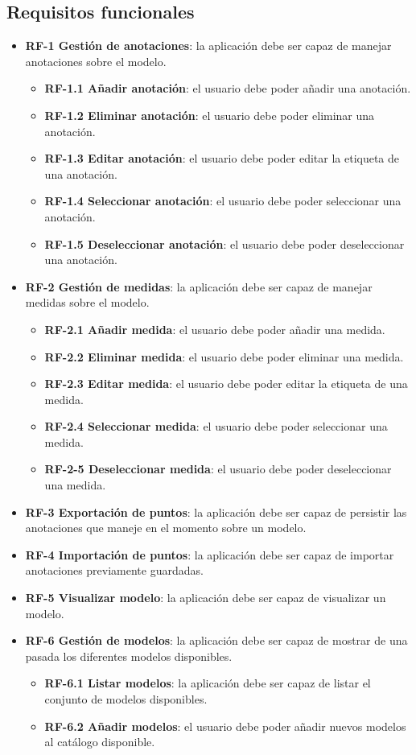 \subsection{Requisitos funcionales}
\begin{itemize}
	\item \textbf{RF-1 Gestión de anotaciones}: la aplicación debe ser capaz de manejar anotaciones sobre el modelo.
	\begin{itemize}
		\item \textbf{RF-1.1 Añadir anotación}: el usuario debe poder añadir una anotación.
		\item \textbf{RF-1.2 Eliminar anotación}: el usuario debe poder eliminar una anotación.
		\item \textbf{RF-1.3 Editar anotación}: el usuario debe poder editar la etiqueta de una anotación.
		\item \textbf{RF-1.4 Seleccionar anotación}: el usuario debe poder seleccionar una anotación.
		\item \textbf{RF-1.5 Deseleccionar anotación}: el usuario debe poder deseleccionar una anotación.
	\end{itemize}
	\item \textbf{RF-2 Gestión de medidas}: la aplicación debe ser capaz de manejar medidas sobre el modelo.
	\begin{itemize}
		\item \textbf{RF-2.1 Añadir medida}: el usuario debe poder añadir una medida.
		\item \textbf{RF-2.2 Eliminar medida}: el usuario debe poder eliminar una medida.
		\item \textbf{RF-2.3 Editar medida}: el usuario debe poder editar la etiqueta de una medida.
		\item \textbf{RF-2.4 Seleccionar medida}: el usuario debe poder seleccionar una medida.
		\item \textbf{RF-2-5 Deseleccionar medida}: el usuario debe poder deseleccionar una medida.
	\end{itemize}
	\item \textbf{RF-3 Exportación de puntos}: la aplicación debe ser capaz de persistir las anotaciones que maneje en el momento sobre un modelo.
	\item \textbf{RF-4 Importación de puntos}: la aplicación debe ser capaz de importar anotaciones previamente guardadas.
	\item \textbf{RF-5 Visualizar modelo}: la aplicación debe ser capaz de visualizar un modelo.
	\item \textbf{RF-6 Gestión de modelos}: la aplicación debe ser capaz de mostrar de una pasada los diferentes modelos disponibles.
	\begin{itemize}
		\item \textbf{RF-6.1 Listar modelos}: la aplicación debe ser capaz de listar el conjunto de modelos disponibles.
		\item \textbf{RF-6.2 Añadir modelos}: el usuario debe poder añadir nuevos modelos al catálogo disponible.
	\end{itemize}
\end{itemize}

